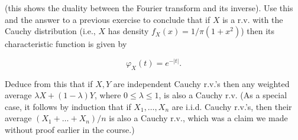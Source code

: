 \documentclass[11pt]{report}
\theoremstyle{plain}
\theoremstyle{definition}
\begin{document}
\begin{enumerate}[label=\arabic*.]
(this shows the duality between the Fourier transform and its inverse). Use this and the answer to a previous exercise to conclude that if $X$ is a r.v. with the Cauchy distribution (i.e., $X$ has density $f_X(x)=1/\pi(1+x^2)$) then its characteristic function is given by

\[
\varphi_X(t) = e^{-|t|}.
\]

Deduce from this that if $X,Y$ are independent Cauchy r.v.'s then any weighted average $\lambda X+(1-\lambda)Y$, where $0\le \lambda\le 1$, is also a Cauchy r.v. (As a special case, it follows by induction that if
$X_1,\ldots,X_n$ are i.i.d. Cauchy r.v.'s, then their average $(X_1+\ldots+X_n)/n$ is also a Cauchy r.v., which was a claim we made without proof earlier in the course.)
\end{enumerate}
\end{document}
